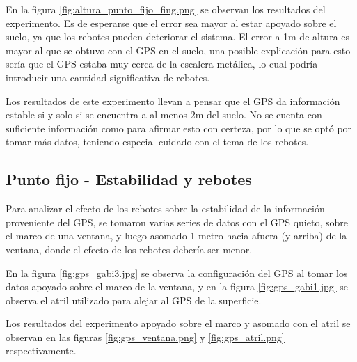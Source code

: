 \documentclass[spanish,12pt,a4paper,titlepage]{report}
\begin{document}
En la figura \ref{fig:altura_punto_fijo_fing.png} se observan los resultados del experimento. Es de esperarse que el error sea mayor al estar apoyado sobre el suelo, ya que los rebotes pueden deteriorar el sistema. El error a 1m de altura es mayor al que se obtuvo con el GPS en el suelo, una posible explicación para esto sería que el GPS estaba muy cerca de la escalera metálica, lo cual podría introducir una cantidad significativa de rebotes.

Los resultados de este experimento llevan a pensar que el GPS da información estable si y solo si se encuentra a al menos 2m del suelo. No se cuenta con suficiente información como para afirmar esto con certeza, por lo que se optó por tomar más datos, teniendo especial cuidado con el tema de los rebotes.

\subsection{Punto fijo - Estabilidad y rebotes}
\label{sec:altura-punto-fijo-estabilidad}

Para analizar el efecto de los rebotes sobre la estabilidad de la información proveniente del GPS, se tomaron varias series de datos con el GPS quieto, sobre el marco de una ventana, y luego asomado 1 metro hacia afuera (y arriba) de la ventana, donde el efecto de los rebotes debería ser menor.

En la figura \ref{fig:gps_gabi3.jpg} se observa la configuración del GPS al tomar los datos apoyado sobre el marco de la ventana, y en la figura \ref{fig:gps_gabi1.jpg} se observa el atril utilizado para alejar al GPS de la superficie.


Los resultados del experimento apoyado sobre el marco y asomado con el atril se observan en las figuras \ref{fig:gps_ventana.png} y \ref{fig:gps_atril.png} respectivamente.

\end{document}
